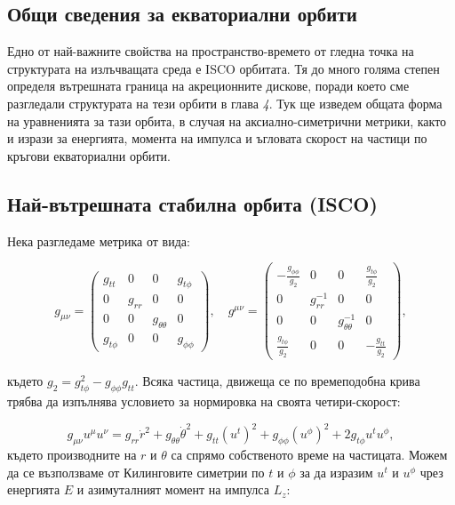 \begin{appendices}
	
	\section{Общи сведения за екваториални орбити}
	
		Едно от най-важните свойства на пространство-времето от гледна точка на структурата на излъчващата среда е ISCO орбитата. Тя до много голяма степен определя вътрешната граница на акреционните дискове, поради което сме разгледали структурата на тези орбити в глава \emph{4}. Тук ще изведем общата форма на уравненията за тази орбита, в случая на аксиално-симетрични метрики, както и изрази за енергията, момента на импулса и ъгловата скорост на частици по кръгови екваториални орбити.
		
		\subsection{Най-вътрешната стабилна орбита (ISCO)}
		
		Нека разгледаме метрика от вида:
		
			\begin{equation}
			g_{\mu\nu}=
			\begin{pmatrix}
				g_{tt} & 0 & 0 & g_{t\phi}\\
				0 & g_{rr} & 0 & 0\\
				0 & 0 & g_{\theta\theta} & 0\\
				g_{t\phi} & 0 & 0 & g_{\phi\phi}
			\end{pmatrix}
			,\quad
			g^{\mu\nu}=
			\begin{pmatrix}
				-\frac{g_{\phi\phi}}{g_2} & 0 & 0 & \frac{g_{t\phi}}{g_2}\\
				0 & g_{rr}^{-1} & 0 & 0\\
				0 & 0 & g_{\theta\theta}^{-1} & 0\\
				\frac{g_{t\phi}}{g_2} & 0 & 0 & -\frac{g_{tt}}{g_2}
			\end{pmatrix},
		\end{equation}
	
	където $g_2 = g_{t\phi}^2 - g_{\phi\phi}g_{tt}$. Всяка частица, движеща се по времеподобна крива трябва да изпълнява условието за нормировка на своята четири-скорост:
	
	\begin{equation}
		g_{\mu\nu}u^\mu u^\nu = g_{rr}\dot{r}^2 + g_{\theta\theta}\dot{\theta}^2 + g_{tt}\left(u^t\right)^2 + g_{\phi\phi}\left(u^\phi\right)^2 + 2g_{t\phi}u^tu^\phi,
	\end{equation}
	където производните на $r$ и $\theta$ са спрямо собственото време на частицата. Можем да се възползваме от Килинговите симетрии по $t$ и $\phi$ за да изразим $u^t$ и $u^\phi$ чрез енергията $E$ и азимуталният момент на импулса $L_z$:
	

\end{appendices}
